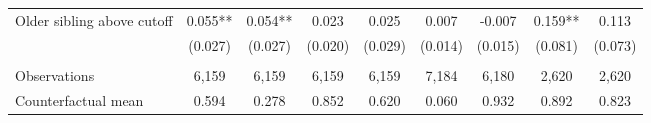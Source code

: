 {{\begin{tabular}{lcccccccc}
Older sibling above cutoff&       0.055** &       0.054** &       0.023   &       0.025   &       0.007   &      -0.007   &       0.159** &       0.113   \\
                    &     (0.027)   &     (0.027)   &     (0.020)   &     (0.029)   &     (0.014)   &     (0.015)   &     (0.081)   &     (0.073)   \\
                    &               &               &               &               &               &               &               &               \\
Observations        &       6,159   &       6,159   &       6,159   &       6,159   &       7,184   &       6,180   &       2,620   &       2,620   \\
Counterfactual mean &       0.594   &       0.278   &       0.852   &       0.620   &       0.060   &       0.932   &       0.892   &       0.823   \\
 

\bottomrule
\end{tabular}
}
}

